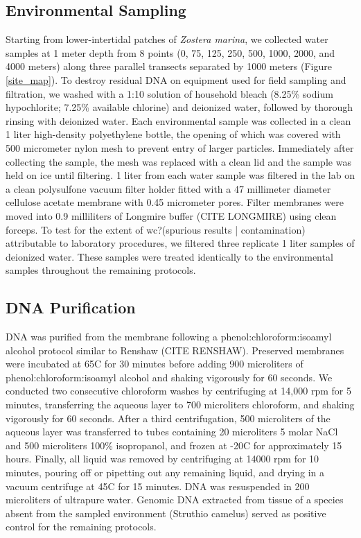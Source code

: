 \documentclass[11pt,letterpaper]{article} %
\begin{document}
\subsection*{Environmental Sampling}
Starting from lower-intertidal patches of \textit{Zostera marina}, we collected water samples at 1 meter depth from 8 points (0, 75, 125, 250, 500, 1000, 2000, and 4000 meters) along three parallel transects separated by 1000 meters (Figure \ref{site_map}).
To destroy residual DNA on equipment used for field sampling and filtration, we washed with a 1:10 solution of household bleach (8.25\% sodium hypochlorite; 7.25\% available chlorine) and deionized water, followed by thorough rinsing with deionized water.
Each environmental sample was collected in a clean 1 liter high-density polyethylene bottle, the opening of which was covered with 500 micrometer nylon mesh to prevent entry of larger particles.
Immediately after collecting the sample, the mesh was replaced with a clean lid and the sample was held on ice until filtering.
1 liter from each water sample was filtered in the lab on a clean polysulfone vacuum filter holder fitted with a 47 millimeter diameter cellulose acetate membrane with 0.45 micrometer pores.
Filter membranes were moved into 0.9 milliliters of Longmire buffer (CITE LONGMIRE) using clean forceps.
To test for the extent of wc?(spurious results | contamination) attributable to laboratory procedures, we filtered three replicate 1 liter samples of deionized water.
These samples were treated identically to the environmental samples throughout the remaining protocols.

\subsection*{DNA Purification}

DNA was purified from the membrane following a phenol:chloroform:isoamyl alcohol protocol similar to Renshaw (CITE RENSHAW).
Preserved membranes were incubated at 65C for 30 minutes before adding 900 microliters of phenol:chloroform:isoamyl alcohol and shaking vigorously for 60 seconds.
We conducted two consecutive chloroform washes by centrifuging at 14,000 rpm for 5 minutes, transferring the aqueous layer to 700 microliters chloroform, and shaking vigorously for 60 seconds.
After a third centrifugation, 500 microliters of the aqueous layer was transferred to tubes containing 20 microliters 5 molar NaCl and 500 microliters 100\% isopropanol, and frozen at -20C for approximately 15 hours.
Finally, all liquid was removed by centrifuging at 14000 rpm for 10 minutes, pouring off or pipetting out any remaining liquid, and drying in a vacuum centrifuge at 45C for 15 minutes.
DNA was resuspended in 200 microliters of ultrapure water.
Genomic DNA extracted from tissue of a species absent from the sampled environment (Struthio camelus) served as positive control for the remaining protocols.
\end{document}
